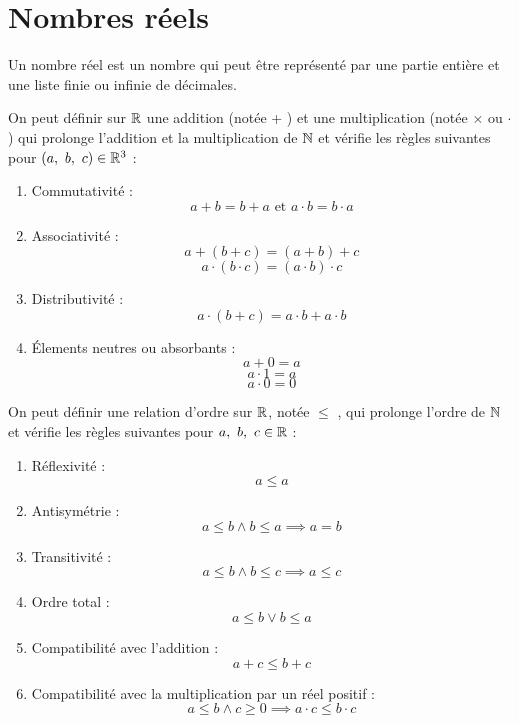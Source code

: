 \chapter{Nombres réels}\label{chap:nb_reels}

\begin{definition}
    Un nombre réel est un nombre qui peut être représenté par une partie entière et une liste finie ou infinie de décimales.
\end{definition}

\begin{proposition}
    On peut définir sur $\mathbb{R}$ une addition (notée \og + \fg) et une multiplication (notée \og $\times$ \fg ou \og $\cdot$ \fg) qui prolonge l'addition et la multiplication de $\mathbb{N}$ et vérifie les règles suivantes pour $(a,\ b,\ c) \in \mathbb{R}^3$ :
    \begin{enumerate}
        \item Commutativité : 
        \[ a + b = b + a \text{ et } a \cdot b = b \cdot a \]
        \item Associativité : 
        \[ a + (b + c) = (a + b) + c \]
        \[ a \cdot (b \cdot c) = (a \cdot b) \cdot c \]
        \item Distributivité : 
        \[ a \cdot (b + c) = a \cdot b + a \cdot b \]
        \item \'Elements neutres ou absorbants :
        \[ a + 0 = a \]
        \[ a \cdot 1 = a \]
        \[a \cdot 0 = 0 \]
    \end{enumerate}
\end{proposition}

\begin{proposition}
    On peut définir une relation d'ordre sur $\mathbb{R}$, notée \og $\leq$ \fg, qui prolonge l'ordre de $\mathbb{N}$ et vérifie les règles suivantes pour $a,\ b,\ c \in \mathbb{R}$ :
    \begin{enumerate}
        \item Réflexivité : 
        \[ a \leq a \]
        \item Antisymétrie : 
        \[ a \leq b \land b \leq a \implies a = b \]
        \item Transitivité : 
        \[ a \leq b \land b \leq c \implies a \leq c \]
        \item Ordre total : 
        \[ a \leq b \lor b \leq a \]
        \item Compatibilité avec l'addition :
        \[ a + c \leq b + c \]
        \item Compatibilité avec la multiplication par un réel positif :
        \[ a \leq b \land c \geq 0 \implies a \cdot c \leq b \cdot c \]
    \end{enumerate}
\end{proposition}

